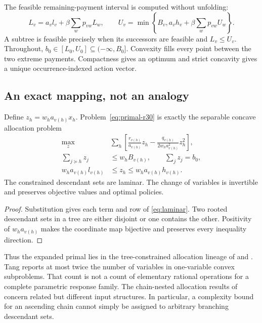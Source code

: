 The feasible remaining-payment interval is computed without unfolding:
\begin{equation}\label{eq:intervals-r30}
 L_v=a_vl_v+\beta\sum_wp_{vw}L_w,\qquad
 U_v=\min\left\{B_v,a_vh_v+\beta\sum_wp_{vw}U_w\right\}.
\end{equation}
A subtree is feasible precisely when its successors are feasible and $L_v\leq U_v$. Throughout, $b_0\in[L_0,U_0]\subseteq(-\infty,B_0]$. Convexity fills every point between the two extreme payments. Compactness gives an optimum and strict concavity gives a unique occurrence-indexed action vector.

\subsection{An exact mapping, not an analogy}
\begin{proposition}\label{prop:laminar}
Define $z_h=w_ha_{v(h)}x_h$. Problem~\eqref{eq:primal-r30} is exactly the separable concave allocation problem
\begin{align}
 \max_z\quad &\sum_h\left[\frac{r_{v(h)}}{a_{v(h)}}z_h-
 \frac{q_{v(h)}}{2w_ha_{v(h)}^2}z_h^2\right],\label{eq:laminar}\\
 \sum_{j\succeq h}z_j&\leq w_hB_{v(h)},\qquad \sum_jz_j=b_0,\nonumber\\
 w_ha_{v(h)}l_{v(h)}&\leq z_h\leq w_ha_{v(h)}h_{v(h)}.\nonumber
\end{align}
The constrained descendant sets are laminar. The change of variables is invertible and preserves objective values and optimal policies.
\end{proposition}
\begin{proof}
Substitution gives each term and row of \eqref{eq:laminar}. Two rooted descendant sets in a tree are either disjoint or one contains the other. Positivity of $w_ha_{v(h)}$ makes the coordinate map bijective and preserves every inequality direction.\end{proof}

Thus the expanded primal lies in the tree-constrained allocation lineage of \citet{Mjelde1983} and \citet{Tang1990}. Tang reports at most twice the number of variables in one-variable convex subproblems. That count is not a count of elementary rational operations for a complete parametric response family. The chain-nested allocation results of \citet{Vidal2016,SchootUiterkamp2021,Wu2021} concern related but different input structures. In particular, a complexity bound for an ascending chain cannot simply be assigned to arbitrary branching descendant sets.

